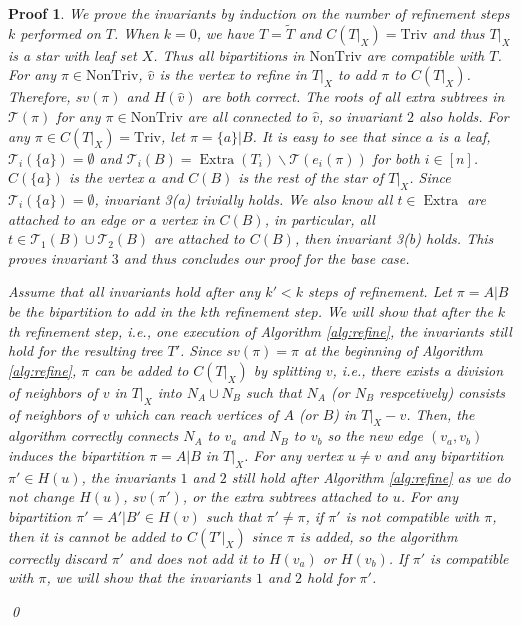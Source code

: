 \documentclass[twocolumn]{bmcart}%
\newcommand{\triv}{\mathrm{Triv}}
\newcommand{\ntriv}{\mathrm{NonTriv}}
\DeclareMathOperator*{\extra}{Extra}
\theoremstyle{mystyle}
\theoremstyle{proofstyle}
\newtheorem*{proof2}{Proof}
\newenvironment{proofnospace}{\begin{proof2}}{\qed \end{proof2}}
\begin{document}
\begin{proofnospace}
    We prove the invariants by induction on the number of refinement steps $k$ performed on $T$. When $k=0$, we have $T = \tilde{T}$ and $C(T|_X) = \triv$ and thus $T|_X$ is a star with leaf set $X$. Thus all bipartitions in $\ntriv$ are compatible with $T$. For any $\pi \in \ntriv $, $\hat{v}$ is the vertex to refine in $T|_X$ to add $\pi$ to $C(T|_X)$. Therefore, $sv(\pi)$ and $H(\hat{v})$ are both correct. The roots of all extra subtrees in $\mathcal{T}(\pi)$ for any $\pi \in \ntriv$ are all connected to $\hat{v}$, so invariant $2$ also holds. For any $\pi \in C(T|_X) = \triv$, let $\pi = \{a\}|B$. It is easy to see that since $a$ is a leaf, $\mathcal{T}_i(\{a\}) = \emptyset$ and $\mathcal{T}_i(B) = \extra(T_i) \backslash \mathcal{T}(e_i(\pi))$ for both $i \in [n]$. $C(\{a\})$ is the vertex $a$ and $C(B)$ is the rest of the star of $T|_X$. Since $\mathcal{T}_i(\{a\}) = \emptyset$, invariant 3(a) trivially holds. We also know all $t \in \extra$ are attached to an edge or a vertex in $C(B)$, in particular, all $t \in \mathcal{T}_1(B)\cup \mathcal{T}_2(B)$ are attached to $C(B)$, then invariant 3(b) holds. This proves invariant $3$ and thus concludes our proof for the base case.
    
    Assume that all invariants hold after any $k' < k$ steps of refinement. Let $\pi = A|B$ be the bipartition to add in the $k$th refinement step. We will show that after the $k$th refinement step, i.e., one execution of Algorithm \ref{alg:refine}, the invariants still hold for the resulting tree $T'$. Since $sv(\pi) = \pi$ at the beginning of Algorithm \ref{alg:refine}, $\pi$ can be added to $C(T|_X)$ by splitting $v$, i.e., there exists a division of neighbors of $v$ in $T|_X$ into $N_A \cup N_B$ such that $N_A$ (or $N_B$ respcetively) consists of neighbors of $v$ which can reach vertices of $A$ (or $B$) in $T|_X-v$. Then, the algorithm correctly connects $N_A$ to $v_a$ and $N_B$ to $v_b$ so the new edge $(v_a,v_b)$ induces the bipartition $\pi = A|B$ in $T|_X$. For any vertex $u \neq v$ and any bipartition $\pi' \in H(u)$, the invariants $1$ and $2$ still hold after Algorithm \ref{alg:refine} as we do not change $H(u)$, $sv(\pi')$, or the extra subtrees attached to $u$. For any bipartition $\pi' = A'|B' \in H(v)$ such that $\pi' \neq \pi$, if $\pi'$ is not compatible with $\pi$, then it is cannot be added to $C(T'|_X)$ since $\pi$ is added, so the algorithm correctly discard $\pi'$ and does not add it to $H(v_a)$ or $H(v_b)$. If $\pi'$ is compatible with $\pi$, we will show that the invariants $1$ and $2$ hold for $\pi'$.
    

\end{proofnospace}
\end{document}
